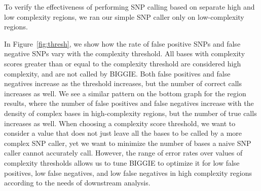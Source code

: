 \documentclass[10pt]{article}
\begin{document}
To verify the
effectiveness of performing SNP calling based on separate high and low
complexity regions, we ran our simple SNP caller only on low-complexity regions.

In Figure~\ref{fig:thresh}, we show how the rate of false positive SNPs and false negative SNPs vary with the complexity threshold.
All bases with complexity scores greater than or equal to the complexity threshold are considered high complexity, and are not called by BIGGIE.
Both false positives and false negatives increase as the threshold increases, but the number of correct calls increases as well.
We see a similar pattern on the bottom graph for the region results, where the number of false positives and false negatives increase with the density of complex bases in high-complexity regions, but the number of true calls increases as well.
When choosing a complexity score threshold, we want to consider a value that does not just leave all the bases to be called by a more complex SNP caller, yet we want to minimize the number of bases a naive SNP caller cannot accurately call.
However, the range of error rates over values of complexity thresholds allows us to tune BIGGIE to optimize it for low false positives, low false negatives, and low false negatives in high complexity regions according to the needs of downstream analysis.
\end{document}
